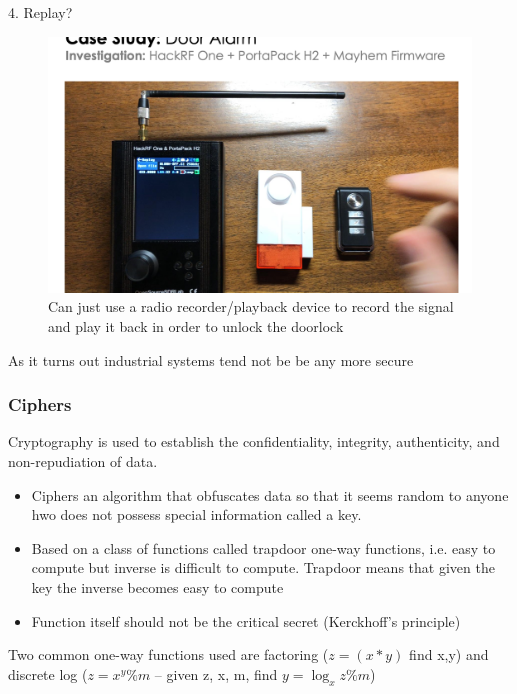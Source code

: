 \documentclass[../notes.tex]{subfiles}
\begin{document}
\begin{blockquote}
    4. Replay?

    \begin{figure}[H]
        \centering
        \includegraphics[width=0.8\linewidth]{img/image_2023-01-30-18-50-56.png}
        \caption{Can just use a radio recorder/playback device to record the signal and play it back in order to unlock the doorlock}
    \end{figure}

\end{blockquote}

As it turns out industrial systems tend not be be any more secure


\subsubsection{Ciphers}

Cryptography is used to establish the confidentiality, integrity, authenticity, and non-repudiation of data.

\begin{itemize}
    \item Ciphers an algorithm that obfuscates data so that it seems random to anyone hwo does not possess special information called a key.
    \item Based on a class of functions called trapdoor one-way functions, i.e. easy to compute but inverse is difficult to compute. Trapdoor means that given the key the inverse becomes easy to compute
    \item Function itself should not be the critical secret (Kerckhoff's principle)
\end{itemize}

Two common one-way functions used are factoring ($ z=(x*y)$ find x,y) and discrete log ($z= x^y \% m $ -- given z, x, m, find $ y = \log_x z \% m $)
\end{document}
